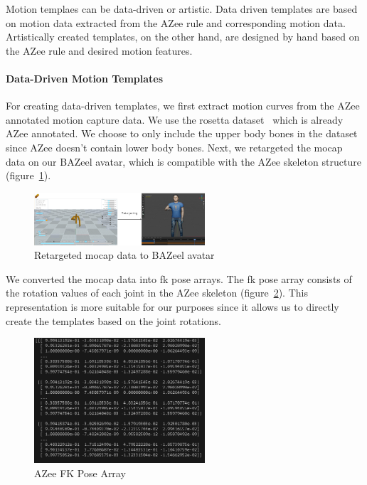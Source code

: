 \documentclass[../../main.tex]{subfiles}
\begin{document}
Motion templaes can be data-driven or artistic. Data driven templates are based on motion data extracted from the AZee rule and corresponding motion data. Artistically created templates, on the other hand, are designed by hand based on the AZee rule and desired motion features.

\paragraph{Data-Driven Motion Templates}
\label{ch:intermediate_blocks_pose_correction:creating_motion_templates:data_driven}

For creating data-driven templates, we first extract motion curves from the AZee annotated motion capture data. We use the rosetta dataset~\cite{bertin2022rosetta} which is already AZee annotated. We choose to only include the upper body bones in the dataset since AZee doesn't contain lower body bones. Next, we retargeted the \gls{mocap} data on our BAZeel avatar, which is compatible with the AZee skeleton structure (figure~\ref{fig:retargeted}).

\begin{figure}
  \centering \includegraphics[width = 2.5in]{chapters/intermediate_blocks_pose_correction/images/retargeted.png}
  \caption{Retargeted mocap data to BAZeel avatar}
  \label{fig:retargeted}
\end{figure}

We converted the \gls{mocap} data into \gls{fk} pose arrays. The \gls{fk} pose array consists of the rotation values of each joint in the AZee skeleton (figure~\ref{fig:azee_fk_pose}). This representation is more suitable for our purposes since it allows us to directly create the templates based on the joint rotations.

\begin{figure}
  \centering \includegraphics[width = 2.5in]{chapters/intermediate_blocks_pose_correction/images/azee_fk_pose.png}
  \caption{AZee FK Pose Array}
  \label{fig:azee_fk_pose}
\end{figure}
\end{document}
